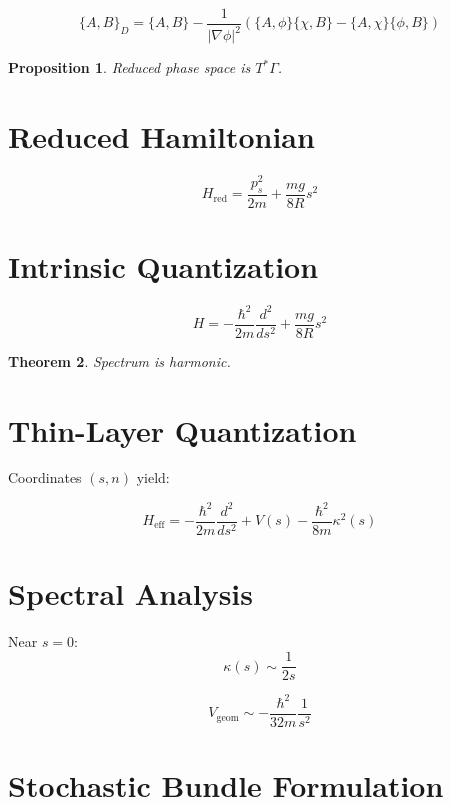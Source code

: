 \documentclass[11pt]{article}
\newtheorem{theorem}{Theorem}[section]
\newtheorem{proposition}[theorem]{Proposition}
\begin{document}
\begin{equation}
\{A,B\}_D =
\{A,B\}
- \frac{1}{|\nabla\phi|^2}
(\{A,\phi\}\{\chi,B\} - \{A,\chi\}\{\phi,B\})
\end{equation}

\begin{proposition}
Reduced phase space is $T^*\Gamma$.
\end{proposition}

\section{Reduced Hamiltonian}

\begin{equation}
H_{\mathrm{red}} =
\frac{p_s^2}{2m} + \frac{mg}{8R}s^2
\end{equation}

\section{Intrinsic Quantization}

\begin{equation}
H =
-\frac{\hbar^2}{2m}\frac{d^2}{ds^2}
+ \frac{mg}{8R}s^2
\end{equation}

\begin{theorem}
Spectrum is harmonic.
\end{theorem}

\section{Thin-Layer Quantization}

Coordinates $(s,n)$ yield:

\begin{equation}
H_{\mathrm{eff}} =
-\frac{\hbar^2}{2m}\frac{d^2}{ds^2}
+ V(s)
-\frac{\hbar^2}{8m}\kappa^2(s)
\end{equation}

\section{Spectral Analysis}

Near $s=0$:
\[
\kappa(s) \sim \frac{1}{2s}
\]

\begin{equation}
V_{\mathrm{geom}} \sim -\frac{\hbar^2}{32m}\frac{1}{s^2}
\end{equation}

\section{Stochastic Bundle Formulation}
\end{document}
